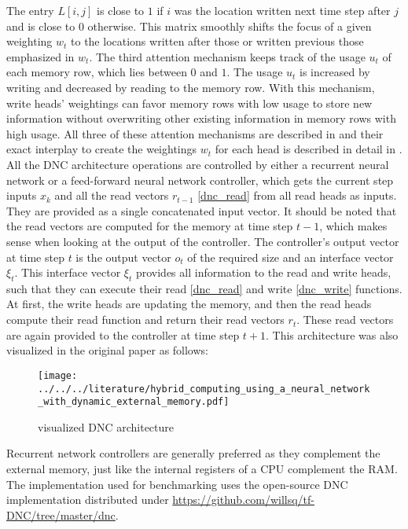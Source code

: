 \documentclass[draft,final]{vutinfth} %
\begin{document}
    The entry $L[i,j]$ is close to $1$ if $i$ was the location written next time step after $j$ and is close to $0$ otherwise.
    This matrix smoothly shifts the focus of a given weighting $w_t$ to the locations written after those or written previous those emphasized in $w_t$.
    The third attention mechanism keeps track of the usage $u_t$ of each memory row, which lies between $0$ and $1$.
    The usage $u_t$ is increased by writing and decreased by reading to the memory row.
    With this mechanism, write heads' weightings can favor memory rows with low usage to store new information without overwriting other existing information in memory rows with high usage.
    All three of these attention mechanisms are described in \cite[p. 1-2]{DNC} and their exact interplay to create the weightings $w_t$ for each head is described in detail in \cite[p. 7-8]{DNC}.
    All the DNC architecture operations are controlled by either a recurrent neural network or a feed-forward neural network controller, which gets the current step inputs $x_k$ and all the read vectors $r_{t-1}$ \ref{dnc_read} from all read heads as inputs.
    They are provided as a single concatenated input vector.
    It should be noted that the read vectors are computed for the memory at time step $t-1$, which makes sense when looking at the output of the controller.
    The controller's output vector at time step $t$ is the output vector $o_t$ of the required size and an interface vector $\xi_t$.
    This interface vector $\xi_t$ provides all information to the read and write heads, such that they can execute their read \ref{dnc_read} and write \ref{dnc_write} functions.
    At first, the write heads are updating the memory, and then the read heads compute their read function and return their read vectors $r_t$.
    These read vectors are again provided to the controller at time step $t+1$.
    This architecture was also visualized in the original paper as follows:
    \begin{figure}[H]
        \centering{}
        \texttt{[image: ../../../literature/hybrid\_computing\_using\_a\_neural\_network\_with\_dynamic\_external\_memory.pdf]}
        \caption{visualized DNC architecture \cite[p. 2]{DNC}}
        \label{fig:dnc_vis}
    \end{figure}
    Recurrent network controllers are generally preferred as they complement the external memory, just like the internal registers of a CPU complement the RAM.
    The implementation used for benchmarking uses the open-source DNC implementation distributed under \url{https://github.com/willsq/tf-DNC/tree/master/dnc}.
\end{document}
